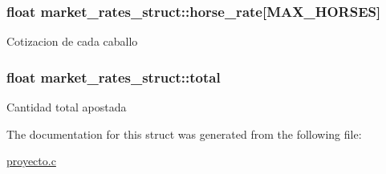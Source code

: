 \subsubsection[{\texorpdfstring{horse\+\_\+rate}{horse_rate}}]{\setlength{\rightskip}{0pt plus 5cm}float market\+\_\+rates\+\_\+struct\+::horse\+\_\+rate\mbox{[}{\bf M\+A\+X\+\_\+\+H\+O\+R\+S\+ES}\mbox{]}}\hypertarget{structmarket__rates__struct_ad3c6f2f118a4c411a8035256851d141a}{}\label{structmarket__rates__struct_ad3c6f2f118a4c411a8035256851d141a}
Cotizacion de cada caballo 
\subsubsection[{\texorpdfstring{total}{total}}]{\setlength{\rightskip}{0pt plus 5cm}float market\+\_\+rates\+\_\+struct\+::total}\hypertarget{structmarket__rates__struct_afabd309263178532df483c3f56acb586}{}\label{structmarket__rates__struct_afabd309263178532df483c3f56acb586}
Cantidad total apostada 

The documentation for this struct was generated from the following file\+:\begin{DoxyCompactItemize}
\item 
\hyperlink{proyecto_8c}{proyecto.\+c}\end{DoxyCompactItemize}
